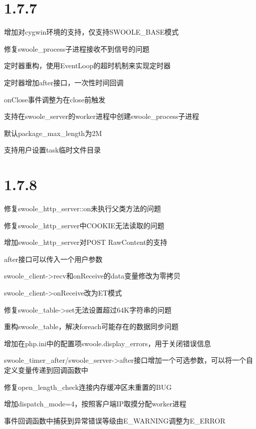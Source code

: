 \section{1.7.7}

\begin{compactitem}
\item 增加对cygwin环境的支持，仅支持SWOOLE\_BASE模式
\item 修复swoole\_process子进程接收不到信号的问题
\item 定时器重构，使用EventLoop的超时机制来实现定时器
\item 定时器增加after接口，一次性时间回调
\item onClose事件调整为在close前触发
\item 支持在swoole\_server的worker进程中创建swoole_process子进程
\item 默认package\_max\_length为2M
\item 支持用户设置task临时文件目录
\end{compactitem}

\section{1.7.8}


\begin{compactitem}
\item 修复swoole\_http\_server::on未执行父类方法的问题
\item 修复swoole\_http\_server中COOKIE无法读取的问题
\item 增加swoole\_http\_server对POST RawContent的支持
\item after接口可以传入一个用户参数
\item swoole\_client->recv和onReceive的data变量修改为零拷贝
\item swoole\_client->onReceive改为ET模式
\item 修复swoole\_table->set无法设置超过64K字符串的问题
\item 重构swoole\_table，解决foreach可能存在的数据同步问题
\item 增加在php.ini中的配置项swoole.display\_errors，用于关闭错误信息
\item swoole\_timer\_after/swoole\_server->after接口增加一个可选参数，可以将一个自定义变量传递到回调函数中
\item 修复open\_length\_check连接内存缓冲区未重置的BUG
\item 增加dispatch\_mode=4，按照客户端IP取摸分配worker进程
\item 事件回调函数中捕获到异常错误等级由E\_WARNING调整为E\_ERROR
\end{compactitem}


